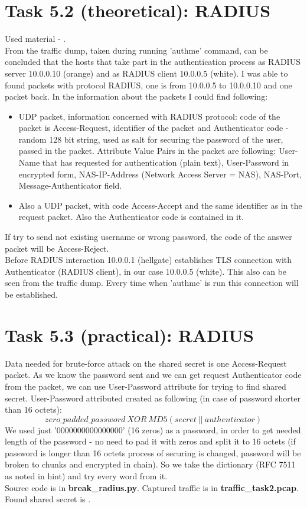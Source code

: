 \documentclass{article}
\begin{document}
\section*{Task 5.2 (theoretical): RADIUS}
Used material - \cite{radius}.
\\
From the traffic dump, taken during running 'authme' command, can be concluded that the hosts that take part in the authentication process as RADIUS server 10.0.0.10 (orange) and as RADIUS client 10.0.0.5 (white). I was able to found packets with protocol RADIUS, one is from 10.0.0.5 to 10.0.0.10 and one packet back. In the information about the packets I could find following:
\begin{itemize}
\item UDP packet, information concerned with RADIUS protocol: code of the packet is Access-Request, identifier of the packet and Authenticator code - random 128 bit string, used as salt for securing the password of the user, passed in the packet. Attribute Value Pairs in the packet are following: User-Name that has requested for authentication (plain text), User-Password in encrypted form, NAS-IP-Address (Network Access Server = NAS), NAS-Port, Message-Authenticator field.
\item Also a UDP packet, with code Access-Accept and the same identifier as in the request packet. Also the Authenticator code is contained in it.
\end{itemize}
If try to send not existing username or wrong password, the code of the answer packet will be Access-Reject.
\\
Before RADIUS interaction 10.0.0.1 (hellgate) establishes TLS connection with Authenticator (RADIUS client), in our case 10.0.0.5 (white). This also can be seen from the traffic dump. Every time when 'authme' is run this connection will be established.

\section*{Task 5.3 (practical): RADIUS}
Data needed for brute-force attack on the shared secret is one Access-Request packet. As we know the password sent and we can get request Authenticator code from the packet, we can use User-Password attribute for trying to find shared secret. User-Password attributed created as following (in case of password shorter than 16 octets): 
$$zero\_padded\_password \ XOR \ MD5(secret \ || \ authenticator)$$
We used just '0000000000000000' (16 zeros) as a password, in order to get needed length of the password - no need to pad it with zeros and split it to 16 octets (if password is longer than 16 octets process of securing is changed, password will be broken to chunks and encrypted in chain). So we take the dictionary (RFC 7511 as noted in hint) and try every word from it.
\\
Source code is in \textbf{break\_radius.py}. Captured traffic is in \textbf{traffic\_task2.pcap}. Found shared secret is \textbf{}.
\end{document}
